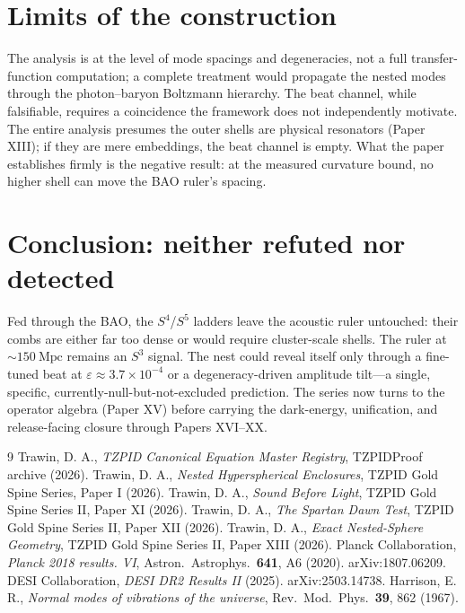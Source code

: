 \documentclass[11pt]{article}
\theoremstyle{remark}
\newcommand{\Mpc}{\mathrm{Mpc}}
\begin{document}
\section{Limits of the construction}
The analysis is at the level of mode spacings and degeneracies, not a full transfer-function computation; a complete treatment would propagate the nested modes through the photon--baryon Boltzmann hierarchy. The beat channel, while falsifiable, requires a coincidence the framework does not independently motivate. The entire analysis presumes the outer shells are physical resonators (Paper XIII); if they are mere embeddings, the beat channel is empty. What the paper establishes firmly is the negative result: at the measured curvature bound, no higher shell can move the BAO ruler's spacing.
\section{Conclusion: neither refuted nor detected}
Fed through the BAO, the $S^4$/$S^5$ ladders leave the acoustic ruler untouched: their combs are either far too dense or would require cluster-scale shells. The ruler at $\sim 150\ \Mpc$ remains an $S^3$ signal. The nest could reveal itself only through a fine-tuned beat at $\varepsilon \approx 3.7\times10^{-4}$ or a degeneracy-driven amplitude tilt---a single, specific, currently-null-but-not-excluded prediction. The series now turns to the operator algebra (Paper XV) before carrying the dark-energy, unification, and release-facing closure through Papers XVI--XX.
\begin{thebibliography}{9}
 Trawin, D. A., \emph{TZPID Canonical Equation Master Registry}, TZPIDProof archive (2026).
 Trawin, D. A., \emph{Nested Hyperspherical Enclosures}, TZPID Gold Spine Series, Paper I (2026).
 Trawin, D. A., \emph{Sound Before Light}, TZPID Gold Spine Series II, Paper XI (2026).
 Trawin, D. A., \emph{The Spartan Dawn Test}, TZPID Gold Spine Series II, Paper XII (2026).
 Trawin, D. A., \emph{Exact Nested-Sphere Geometry}, TZPID Gold Spine Series II, Paper XIII (2026).
 Planck Collaboration, \emph{Planck 2018 results. VI}, Astron.\ Astrophys.\ \textbf{641}, A6 (2020). arXiv:1807.06209.
 DESI Collaboration, \emph{DESI DR2 Results II} (2025). arXiv:2503.14738.
 Harrison, E. R., \emph{Normal modes of vibrations of the universe}, Rev.\ Mod.\ Phys.\ \textbf{39}, 862 (1967).
\end{thebibliography}
\end{document}
